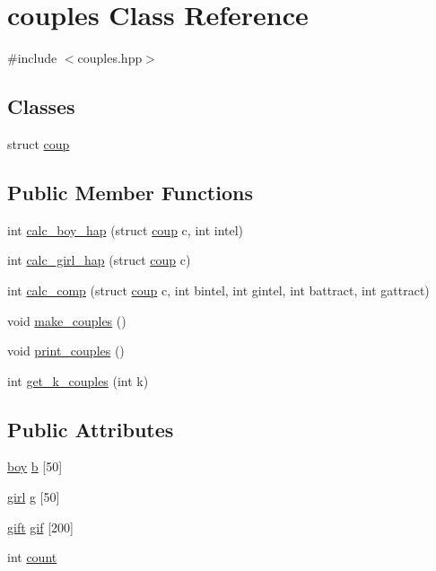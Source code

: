 \hypertarget{classcouples}{}\section{couples Class Reference}
\label{classcouples}


{\ttfamily \#include $<$couples.\+hpp$>$}

\subsection*{Classes}
\begin{DoxyCompactItemize}
\item 
struct \hyperlink{structcouples_1_1coup}{coup}
\end{DoxyCompactItemize}
\subsection*{Public Member Functions}
\begin{DoxyCompactItemize}
\item 
int \hyperlink{classcouples_a55aa04a34886a1c1b46fcfdbd2b400b5}{calc\+\_\+boy\+\_\+hap} (struct \hyperlink{structcouples_1_1coup}{coup} c, int intel)
\item 
int \hyperlink{classcouples_a381ac8c4bf63ba171dcbaec0e8da4d09}{calc\+\_\+girl\+\_\+hap} (struct \hyperlink{structcouples_1_1coup}{coup} c)
\item 
int \hyperlink{classcouples_a6fb93ee889269a6225cedb618f96b9d0}{calc\+\_\+comp} (struct \hyperlink{structcouples_1_1coup}{coup} c, int bintel, int gintel, int battract, int gattract)
\item 
void \hyperlink{classcouples_a5ed789c462f864bfd2ca734c49f5a9f2}{make\+\_\+couples} ()
\item 
void \hyperlink{classcouples_a7740f922a426f0f9b64bf284be3eb251}{print\+\_\+couples} ()
\item 
int \hyperlink{classcouples_af4c76bdad4ebed50ef84498ab71121dd}{get\+\_\+k\+\_\+couples} (int k)
\end{DoxyCompactItemize}
\subsection*{Public Attributes}
\begin{DoxyCompactItemize}
\item 
\hyperlink{classboy}{boy} \hyperlink{classcouples_a467d08e9148858f552b8bfd1655ac888}{b} \mbox{[}50\mbox{]}
\item 
\hyperlink{classgirl}{girl} \hyperlink{classcouples_a4e5a2e8a3321a07c295dd488182d5ae1}{g} \mbox{[}50\mbox{]}
\item 
\hyperlink{classgift}{gift} \hyperlink{classcouples_a33c59b4e2c22609d7d47c467b4434bb1}{gif} \mbox{[}200\mbox{]}
\item 
int \hyperlink{classcouples_aa154166f508ecfb93efdd1fb7516ef20}{count}
\end{DoxyCompactItemize}


